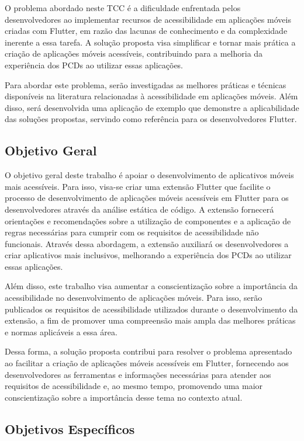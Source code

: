O problema abordado neste TCC é a dificuldade enfrentada pelos desenvolvedores ao implementar recursos de acessibilidade em aplicações móveis criadas com Flutter, em razão das lacunas de conhecimento e da complexidade inerente a essa tarefa. A solução proposta visa simplificar e tornar mais prática a criação de aplicações móveis acessíveis, contribuindo para a melhoria da experiência dos PCDs ao utilizar essas aplicações.

Para abordar este problema, serão investigadas as melhores práticas e técnicas disponíveis na literatura relacionadas à acessibilidade em aplicações móveis. Além disso, será desenvolvida uma aplicação de exemplo que demonstre a aplicabilidade das soluções propostas, servindo como referência para os desenvolvedores Flutter.

\subsection{Objetivo Geral}\label{sec:objetivos}

O objetivo geral deste trabalho é apoiar o desenvolvimento de aplicativos móveis mais acessíveis. Para isso, visa-se criar uma extensão Flutter que facilite o processo de desenvolvimento de aplicações móveis acessíveis em Flutter para os desenvolvedores através da análise estática de código. A extensão fornecerá orientações e recomendações sobre a utilização de componentes e a aplicação de regras necessárias para cumprir com os requisitos de acessibilidade não funcionais. Através dessa abordagem, a extensão auxiliará os desenvolvedores a criar aplicativos mais inclusivos, melhorando a experiência dos PCDs ao utilizar essas aplicações.

Além disso, este trabalho visa aumentar a conscientização sobre a importância da acessibilidade no desenvolvimento de aplicações móveis. Para isso, serão publicados os requisitos de acessibilidade utilizados durante o desenvolvimento da extensão, a fim de promover uma compreensão mais ampla das melhores práticas e normas aplicáveis a essa área.

Dessa forma, a solução proposta contribui para resolver o problema apresentado ao facilitar a criação de aplicações móveis acessíveis em Flutter, fornecendo aos desenvolvedores as ferramentas e informações necessárias para atender aos requisitos de acessibilidade e, ao mesmo tempo, promovendo uma maior conscientização sobre a importância desse tema no contexto atual.

\subsection{Objetivos Específicos}\label{sec:objetivos-especificos}

